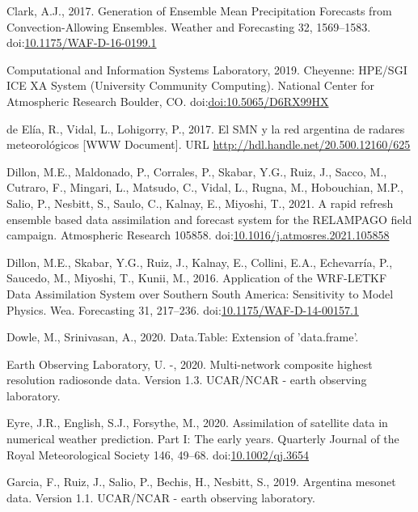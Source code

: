 \documentclass[final,5p,times,twocolumn,authoryear]{elsarticle} %
\begin{document}
\leavevmode\hypertarget{ref-clark2017}{}%
Clark, A.J., 2017. Generation of Ensemble Mean Precipitation Forecasts from Convection-Allowing Ensembles. Weather and Forecasting 32, 1569--1583. doi:\href{https://doi.org/10.1175/WAF-D-16-0199.1}{10.1175/WAF-D-16-0199.1}

\leavevmode\hypertarget{ref-Cheyenne2019}{}%
Computational and Information Systems Laboratory, 2019. Cheyenne: HPE/SGI ICE XA System (University Community Computing). National Center for Atmospheric Research Boulder, CO. doi:\href{https://doi.org/doi:10.5065/D6RX99HX}{doi:10.5065/D6RX99HX}

\leavevmode\hypertarget{ref-deelia2017}{}%
de Elía, R., Vidal, L., Lohigorry, P., 2017. El SMN y la red argentina de radares meteorológicos {[}WWW Document{]}. URL \url{http://hdl.handle.net/20.500.12160/625}

\leavevmode\hypertarget{ref-dillon2021}{}%
Dillon, M.E., Maldonado, P., Corrales, P., Skabar, Y.G., Ruiz, J., Sacco, M., Cutraro, F., Mingari, L., Matsudo, C., Vidal, L., Rugna, M., Hobouchian, M.P., Salio, P., Nesbitt, S., Saulo, C., Kalnay, E., Miyoshi, T., 2021. A rapid refresh ensemble based data assimilation and forecast system for the RELAMPAGO field campaign. Atmospheric Research 105858. doi:\href{https://doi.org/10.1016/j.atmosres.2021.105858}{10.1016/j.atmosres.2021.105858}

\leavevmode\hypertarget{ref-dillon2016}{}%
Dillon, M.E., Skabar, Y.G., Ruiz, J., Kalnay, E., Collini, E.A., Echevarría, P., Saucedo, M., Miyoshi, T., Kunii, M., 2016. Application of the WRF-LETKF Data Assimilation System over Southern South America: Sensitivity to Model Physics. Wea. Forecasting 31, 217--236. doi:\href{https://doi.org/10.1175/WAF-D-14-00157.1}{10.1175/WAF-D-14-00157.1}

\leavevmode\hypertarget{ref-dowle2020}{}%
Dowle, M., Srinivasan, A., 2020. Data.Table: Extension of 'data.frame'.

\leavevmode\hypertarget{ref-sondeos}{}%
Earth Observing Laboratory, U. -, 2020. Multi-network composite highest resolution radiosonde data. Version 1.3. UCAR/NCAR - earth observing laboratory.

\leavevmode\hypertarget{ref-eyre2020}{}%
Eyre, J.R., English, S.J., Forsythe, M., 2020. Assimilation of satellite data in numerical weather prediction. Part I: The early years. Quarterly Journal of the Royal Meteorological Society 146, 49--68. doi:\href{https://doi.org/10.1002/qj.3654}{10.1002/qj.3654}

\leavevmode\hypertarget{ref-garcia2019}{}%
Garcia, F., Ruiz, J., Salio, P., Bechis, H., Nesbitt, S., 2019. Argentina mesonet data. Version 1.1. UCAR/NCAR - earth observing laboratory.
\end{document}
